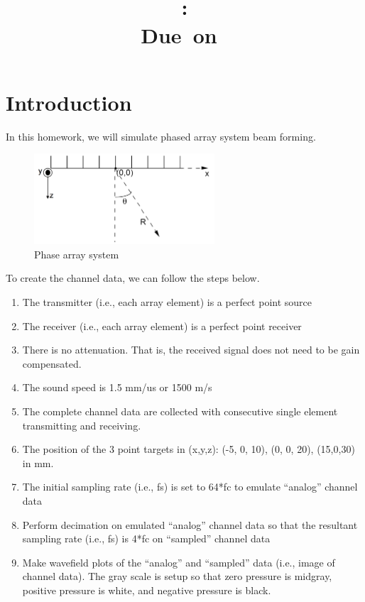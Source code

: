 \documentclass{article}
\title{
    \vspace{2in}
    \textmd{\textbf{\hmwkClass}}\\
    \textmd{\textbf{\hmwkID: \hmwkTitle}} \\
    \normalsize\vspace{0.1in}\small{Due\ on\ \hmwkDueDate}\\
    \vspace{3in}
}
\author{\textbf{\hmwkAuthorName}}
\date{} %
\begin{document}
\maketitle
\newpage

\renewcommand\thesubsection{\thesection.\alph{subsection}}

\section{Introduction}
In this homework, we will simulate phased array system beam forming.
\begin{figure}[H]
    \centering
    \includegraphics[width = 0.6\textwidth]{src/phase-system.png}
    \caption{Phase array system}
\end{figure}

To create the channel data, we can follow the steps below.
\begin{enumerate}
    \item The transmitter (i.e., each array element) is a perfect point source
    \item The receiver (i.e., each array element) is a perfect point receiver
    \item There is no attenuation. That is, the received signal does not need to be gain compensated.
    \item The sound speed is 1.5 mm/us or 1500 m/s
    \item The complete channel data are collected with consecutive single element transmitting and receiving.
    \item The position of the 3 point targets in (x,y,z): (-5, 0, 10), (0, 0, 20), (15,0,30) in mm.
    \item The initial sampling rate (i.e., fs) is set to 64*fc to emulate “analog” channel data
    \item Perform decimation on emulated “analog” channel data so that the resultant sampling rate (i.e., fs) is 4*fc on 
          “sampled” channel data
    \item Make wavefield plots of the “analog” and “sampled” data (i.e., image of channel data). The gray scale is setup so that zero 
          pressure is midgray, positive pressure is white, and negative pressure is black.
\end{enumerate}
\end{document}
